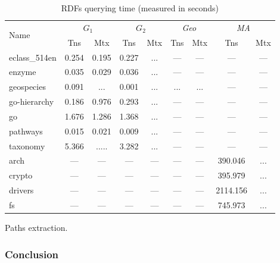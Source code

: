 {\setlength{\tabcolsep}{0.2em}
  \begin{table}
    \caption{RDFs querying time (measured in seconds)}
    \label{tbl:tableRDFQ1_appendix}
    \small
    \begin{tabular}{| l | c | c | c | c | c | c | c | c |}
      \hline
      
      \multirow{2}{*}{Name}  & \multicolumn{2}{c|}{$G_1$} & \multicolumn{2}{c|}{$G_2$} & \multicolumn{2}{c|}{\textit{Geo}} & \multicolumn{2}{c|}{\textit{MA}}\\
      \cline{2-9}
                      & Tns     & Mtx     & Tns   & Mtx & Tns   & Mtx & Tns   & Mtx \\
      \hline
      \hline
      eclass\_514en   & 0.254   & 0.195   & 0.227 & ... & ---   & --- & ---      & ---\\
      enzyme          & 0.035   & 0.029   & 0.036 & ... & ---   & --- & ---      & ---\\
      geospecies      & 0.091   & ...     & 0.001 & ... & ...   & ... & ---      & ---\\
      go-hierarchy    & 0.186   & 0.976   & 0.293 & ... & ---   & --- & ---      & ---\\
      go              & 1.676   & 1.286   & 1.368 & ... & ---   & --- & ---      & ---\\
      pathways        & 0.015   & 0.021   & 0.009 & ... & ---   & --- & ---      & ---\\
      taxonomy        & 5.366   & .....   & 3.282 & ... & ---   & --- & ---      & ---\\
      \hline
      arch            & ---     & ---     & ---   & --- & ---   & --- & 390.046  & ...\\
      crypto          & ---     & ---     & ---   & --- & ---   & --- & 395.979  & ...\\
      drivers         & ---     & ---     & ---   & --- & ---   & --- & 2114.156 & ...\\
      fs              & ---     & ---     & ---   & --- & ---   & --- & 745.973  & ...\\
      \hline
    \end{tabular}
  \end{table}
}


Paths extraction.

\subsubsection{Conclusion}
